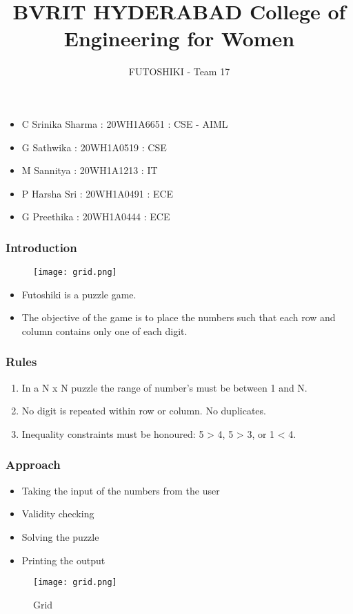 \documentclass[14pt]{beamer}
\title{BVRIT HYDERABAD College of Engineering for Women}
\subtitle{FUTOSHIKI - Team 17}
\begin{document}
 \begin{frame}
        \titlepage
    \end{frame}
\begin{frame}
 \begin{itemize}
       \item C Srinika Sharma : 20WH1A6651 : CSE - AIML
       \item G Sathwika : 20WH1A0519 : CSE
       \item M Sannitya : 20WH1A1213 : IT
       \item P Harsha Sri : 20WH1A0491 : ECE
       \item G Preethika : 20WH1A0444 : ECE
   \end{itemize}
\end{frame}
   \begin{frame}
	\frametitle{Introduction}
        \begin{figure}
            \texttt{[image: grid.png]}
        \end{figure}
        \begin{itemize}
	    \item Futoshiki is a puzzle game.
	    \item  The objective of the game is to place the numbers such that each row and column contains only one of each digit.
	\end{itemize}
   \end{frame}
   \begin{frame}
	\frametitle{Rules}
         \begin{enumerate}
	    \item In a N x N puzzle the range of number's must be between 1 and N.  
	    \item No digit is repeated within row or column. No duplicates. 
	    \item Inequality constraints must be honoured: 5 > 4, 5 > 3, or 1 < 4.
	\end{enumerate}
  \end{frame}
\begin{frame}
   \frametitle{Approach}
   \begin{itemize}
       \item Taking the input of the numbers from the user
       \item Validity checking 
       \item Solving the puzzle 
       \item Printing the output
   \end{itemize}
\begin{figure}
            \texttt{[image: grid.png]}
	  \caption{Grid}
        \end{figure}
\end{frame}
\end{document}
